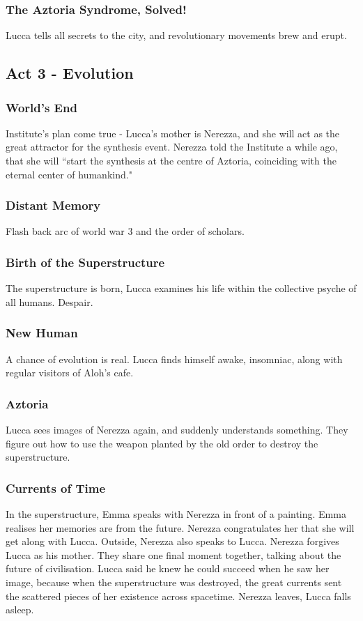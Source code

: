 \documentclass[11pt]{article}
\begin{document}
		\subsubsection{The Aztoria Syndrome, Solved!}
		Lucca tells all secrets to the city, and revolutionary movements brew and erupt.
	\newpage




	\subsection{Act 3 - Evolution}
		\subsubsection{World's End}
		Institute's plan come true - Lucca's mother is Nerezza, and she will act as the great attractor for the synthesis event.
		Nerezza told the Institute a while ago, that she will ``start the synthesis at the centre of Aztoria, coinciding with the eternal center of humankind."
		\subsubsection{Distant Memory}
		Flash back arc of world war 3 and the order of scholars.
		\subsubsection{Birth of the Superstructure}
		The superstructure is born, Lucca examines his life within the collective psyche of all humans. 
		Despair.
		\subsubsection{New Human}
		A chance of evolution is real. 
		Lucca finds himself awake, insomniac, along with regular visitors of Aloh's cafe.
		\subsubsection{Aztoria}
		Lucca sees images of Nerezza again, and suddenly understands something.
		They figure out how to use the weapon planted by the old order to destroy the superstructure.
		\subsubsection{Currents of Time}
		In the superstructure, Emma speaks with Nerezza in front of a painting.
		Emma realises her memories are from the future.
		Nerezza congratulates her that she will get along with Lucca.
		Outside, Nerezza also speaks to Lucca.
		Nerezza forgives Lucca as his mother. 
		They share one final moment together, talking about the future of civilisation.
		Lucca said he knew he could succeed when he saw her image, because when the superstructure was destroyed, the great currents sent the scattered pieces of her existence across spacetime.
		Nerezza leaves, Lucca falls asleep.
\end{document}
